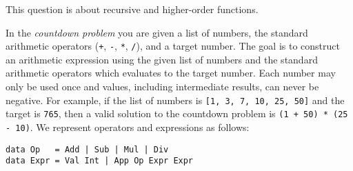 \question This question is about recursive and higher-order functions.

In the \emph{countdown problem} you are given a list of numbers, the standard arithmetic operators (\texttt{+}, \texttt{-}, \texttt{*}, \texttt{/}), and a target number. The goal is to construct an arithmetic expression using the given list of numbers and the standard arithmetic operators which evaluates to the target number. Each number may only be used once and values, including intermediate results, can never be negative. For example, if the list of numbers is \texttt{[1, 3, 7, 10, 25, 50]} and the target is \texttt{765}, then a valid solution to the countdown problem is \texttt{(1 + 50) * (25 - 10)}. We represent operators and expressions as follows:
\begin{verbatim}
data Op   = Add | Sub | Mul | Div
data Expr = Val Int | App Op Expr Expr
\end{verbatim}
